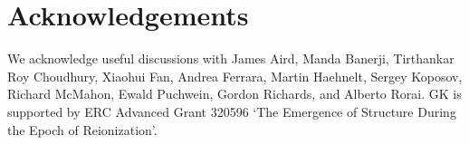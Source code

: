 \documentclass[a4paper,fleqn,usenatbib]{mnras}
\begin{document}
\section*{Acknowledgements}

We acknowledge useful discussions with James Aird, Manda Banerji,
Tirthankar Roy Choudhury, Xiaohui Fan, Andrea Ferrara, Martin
Haehnelt, Sergey Koposov, Richard McMahon, Ewald Puchwein, Gordon
Richards, and Alberto Rorai.  GK is supported by ERC Advanced Grant
320596 `The Emergence of Structure During the Epoch of Reionization'.





\bsp
\label{lastpage}
\end{document}
